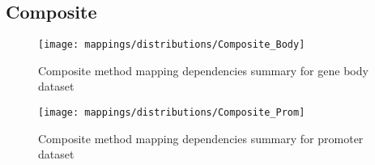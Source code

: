 \pagebreak
\subsection{Composite}

\begin{figure}[H]
	\centering
	\texttt{[image: mappings/distributions/Composite\_Body]}
	\caption{Composite method mapping dependencies summary for gene body dataset}
	\label{fig:map_body_comp}
\end{figure}

\begin{figure}[H]
	\centering
	\texttt{[image: mappings/distributions/Composite\_Prom]}
	\caption{Composite method mapping dependencies summary for promoter dataset}
	\label{fig:map_prom_comp}
\end{figure}